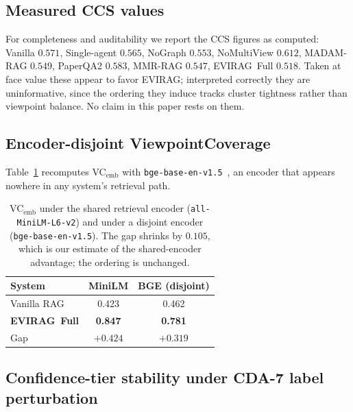 \documentclass[11pt]{article}
\newcommand{\system}{\textsc{EVIRAG}\xspace}
\begin{document}
\subsection{Measured CCS values}

For completeness and auditability we report the CCS figures as computed:
Vanilla $0.571$, Single-agent $0.565$, NoGraph $0.553$, NoMultiView $0.612$,
MADAM-RAG $0.549$, PaperQA2 $0.583$, MMR-RAG $0.547$, \system\ Full $0.518$.
Taken at face value these appear to favor \system; interpreted correctly they
are uninformative, since the ordering they induce tracks cluster tightness
rather than viewpoint balance.  No claim in this paper rests on them.

\subsection{Encoder-disjoint ViewpointCoverage}

Table~\ref{tab:bge} recomputes VC$_\text{emb}$ with
\texttt{bge-base-en-v1.5}~\citep{xiao2024cpack}, an encoder that appears
nowhere in any system's retrieval path.

\begin{table}[h]
\centering\small
\setlength{\tabcolsep}{5pt}
\begin{tabular}{@{}lcc@{}}
\toprule
\textbf{System} & \textbf{MiniLM} & \textbf{BGE (disjoint)} \\
\midrule
Vanilla RAG          & 0.423 & 0.462 \\
\textbf{\system\ Full} & \textbf{0.847} & \textbf{0.781} \\
\midrule
Gap                  & $+0.424$ & $+0.319$ \\
\bottomrule
\end{tabular}
\caption{VC$_\text{emb}$ under the shared retrieval encoder
(\texttt{all-MiniLM-L6-v2}) and under a disjoint encoder
(\texttt{bge-base-en-v1.5}).  The gap shrinks by $0.105$, which is our estimate
of the shared-encoder advantage; the ordering is unchanged.}
\label{tab:bge}
\end{table}

\subsection{Confidence-tier stability under CDA-7 label perturbation}
\end{document}
